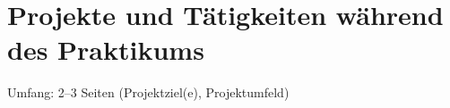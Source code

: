 \chapter{Projekte und Tätigkeiten während des Praktikums}

Umfang: 2--3 Seiten (Projektziel(e), Projektumfeld)